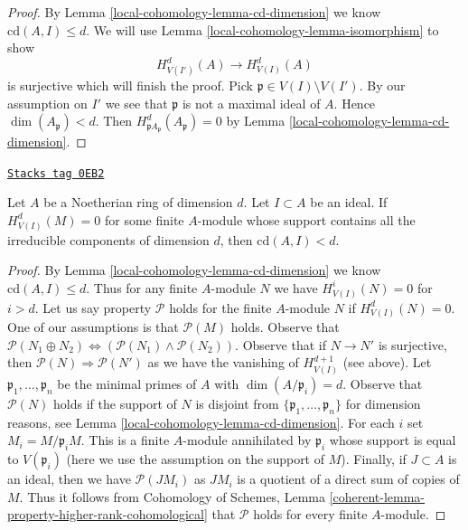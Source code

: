 \begin{proof}
By Lemma \ref{local-cohomology-lemma-cd-dimension} we know $\text{cd}(A, I) \leq d$.
We will use Lemma \ref{local-cohomology-lemma-isomorphism} to show
$$
H^d_{V(I')}(A) \to H^d_{V(I)}(A)
$$
is surjective which will finish the proof. Pick
$\mathfrak p \in V(I) \setminus V(I')$. By our assumption
on $I'$ we see that $\mathfrak p$ is not a maximal ideal of $A$.
Hence $\dim(A_\mathfrak p) < d$. Then
$H^d_{\mathfrak pA_\mathfrak p}(A_\mathfrak p) = 0$
by Lemma \ref{local-cohomology-lemma-cd-dimension}.
\end{proof}

\begin{lemma}
\label{local-cohomology-lemma-cd-top-vanishing-some-module}
\href{https://stacks.math.columbia.edu/tag/0EB2}{\texttt{Stacks tag 0EB2}}

Let $A$ be a Noetherian ring of dimension $d$. Let $I \subset A$
be an ideal. If $H^d_{V(I)}(M) = 0$ for some finite $A$-module
whose support contains all the irreducible components of
dimension $d$, then $\text{cd}(A, I) < d$.
\end{lemma}

\begin{proof}
By Lemma \ref{local-cohomology-lemma-cd-dimension} we know $\text{cd}(A, I) \leq d$.
Thus for any finite $A$-module $N$ we have $H^i_{V(I)}(N) = 0$
for $i > d$. Let us say property $\mathcal{P}$ holds for the
finite $A$-module $N$ if $H^d_{V(I)}(N) = 0$.
One of our assumptions is that $\mathcal{P}(M)$ holds.
Observe that $\mathcal{P}(N_1 \oplus N_2)
\Leftrightarrow (\mathcal{P}(N_1) \wedge \mathcal{P}(N_2))$.
Observe that if $N \to N'$ is surjective, then
$\mathcal{P}(N) \Rightarrow \mathcal{P}(N')$ as we
have the vanishing of $H^{d + 1}_{V(I)}$ (see above).
Let $\mathfrak p_1, \ldots, \mathfrak p_n$ be the
minimal primes of $A$ with $\dim(A/\mathfrak p_i) = d$.
Observe that $\mathcal{P}(N)$ holds if the support
of $N$ is disjoint from $\{\mathfrak p_1, \ldots, \mathfrak p_n\}$
for dimension reasons, see Lemma \ref{local-cohomology-lemma-cd-dimension}.
For each $i$ set $M_i = M/\mathfrak p_i M$.
This is a finite $A$-module annihilated by $\mathfrak p_i$
whose support is equal to
$V(\mathfrak p_i)$ (here we use the assumption on the support of $M$).
Finally, if $J \subset A$ is an ideal, then we have $\mathcal{P}(JM_i)$
as $JM_i$ is a quotient of a direct sum of copies of $M$.
Thus it follows from Cohomology of Schemes, Lemma
\ref{coherent-lemma-property-higher-rank-cohomological}
that $\mathcal{P}$ holds for every finite $A$-module.
\end{proof}

